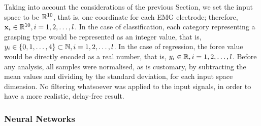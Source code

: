 
Taking into account the considerations of the previous Section, we
set the input space to be $\mathbb{R}^{10}$, that is, one coordinate for
each EMG electrode; therefore, $\mathbf{x}_i \in \mathbb{R}^{10},
i=1,2,\ldots,l$. In the case of classification, each category
representing a grasping type would be represented as an integer
value, that is, $y_i \in \{0,1,\ldots,4\} \subset \mathbb{N},
i=1,2,\ldots,l$. In the case of regression, the force value would
be directly encoded as a real number, that is, $y_i \in \mathbb{R},
i=1,2,\ldots,l$. Before any analysis, all samples were normalised,
as is customary, by subtracting the mean values and dividing by
the standard deviation, for each input space dimension. No
filtering whatsoever was applied to the input signals, in order to
have a more realistic, delay-free result.

\subsubsection{Neural Networks}


